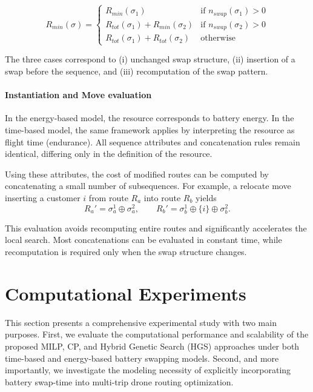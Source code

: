 \documentclass[3p, authoryear, 11pt]{elsarticle}
\begin{document}
\[
R_{min}(\sigma) =
\begin{cases}
R_{min}(\sigma_1) 
& \text{if } n_{swap}(\sigma_1) > 0 \\

R_{tot}(\sigma_1) + R_{min}(\sigma_2) 
& \text{if } n_{swap}(\sigma_2) > 0 \\

R_{tot}(\sigma_1) + R_{tot}(\sigma_2) 
& \text{otherwise}
\end{cases}
\]

The three cases correspond to (i) unchanged swap structure, (ii) insertion of a swap before the sequence, and (iii) recomputation of the swap pattern.


\paragraph{Instantiation and Move evaluation}

In the energy-based model, the resource corresponds to battery energy. 
In the time-based model, the same framework applies by interpreting the resource as flight time (endurance). 
All sequence attributes and concatenation rules remain identical, differing only in the definition of the resource.

Using these attributes, the cost of modified routes can be computed by concatenating a small number of subsequences. 
For example, a relocate move inserting a customer $i$ from route $R_a$ into route $R_b$ yields
\[
R_a' = \sigma_a^1 \oplus \sigma_a^2,
\qquad
R_b' = \sigma_b^1 \oplus \{i\} \oplus \sigma_b^2.
\]

This evaluation avoids recomputing entire routes and significantly accelerates the local search. 
Most concatenations can be evaluated in constant time, while recomputation is required only when the swap structure changes.

\section{Computational Experiments}
\label{sec:computational_experiments}

This section presents a comprehensive experimental study with two main purposes. 
First, we evaluate the computational performance and scalability of the proposed MILP, CP, and Hybrid Genetic Search (HGS) approaches under both time-based and energy-based battery swapping models. 
Second, and more importantly, we investigate the modeling necessity of explicitly incorporating battery swap-time into multi-trip drone routing optimization.
\end{document}
